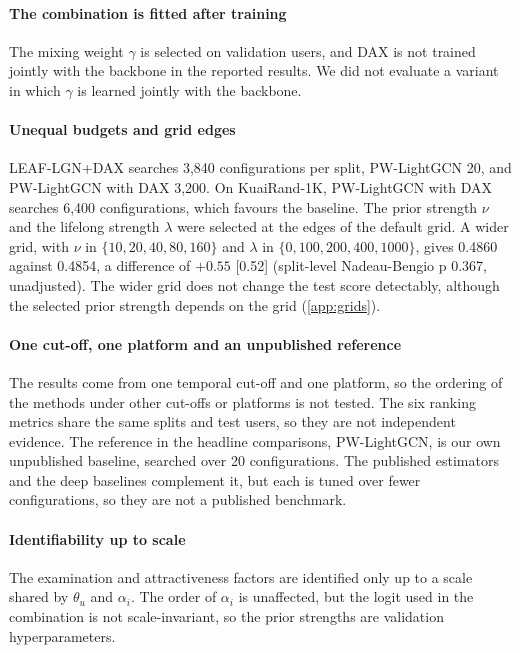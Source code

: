 \documentclass[preprint,12pt,authoryear]{elsarticle}
\begin{document}
\paragraph{The combination is fitted after training} The mixing weight $\gamma$ is selected on validation users, and DAX is not trained jointly with
the backbone in the reported results. We did not evaluate a variant in which $\gamma$ is learned jointly with the backbone.

\paragraph{Unequal budgets and grid edges} LEAF-LGN+DAX searches 3,840 configurations per split, PW-LightGCN 20, and PW-LightGCN with DAX 3,200. On
KuaiRand-1K, PW-LightGCN with DAX searches 6,400 configurations, which favours the baseline. The prior strength $\nu$ and the lifelong strength
$\lambda$ were selected at the edges of the default grid. A wider grid, with $\nu$ in $\{10,20,40,80,160\}$ and $\lambda$ in $\{0,100,200,400,1000\}$,
gives 0.4860 against 0.4854, a difference of $+0.55$ [0.52] (split-level Nadeau-Bengio p 0.367, unadjusted). The wider grid does not change the test score detectably, although the selected prior strength depends on the grid (\ref{app:grids}).

\paragraph{One cut-off, one platform and an unpublished reference} The results come from one temporal cut-off and one platform, so the ordering of the methods under other cut-offs or platforms is not tested. The six ranking metrics share the same splits and test users, so they are not independent evidence. The reference in the headline comparisons, PW-LightGCN, is our own unpublished baseline, searched over 20 configurations. The published estimators and the deep baselines complement it, but each is tuned over fewer configurations, so they are not a published benchmark.

\paragraph{Identifiability up to scale} The examination and attractiveness factors are identified only up to a scale shared by $\theta_u$ and
$\alpha_i$. The order of $\alpha_i$ is unaffected, but the logit used in the combination is not scale-invariant, so the prior strengths are
validation hyperparameters.
\end{document}
